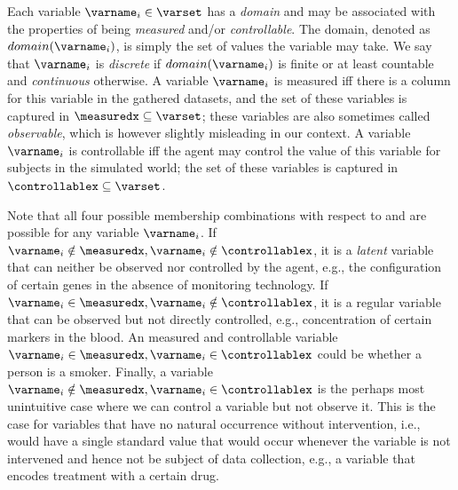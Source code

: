 \documentclass{article}
\begin{document}
        Each variable $\varname_i \in \varset$ has a \emph{domain} and may be associated with the properties of being \emph{measured} and/or \emph{controllable}.
        The domain, denoted as $domain(\varname_i)$, is simply the set of values the variable may take.
        We say that $\varname_i$ is \emph{discrete} if $domain(\varname_i)$ is finite or at least countable and \emph{continuous} otherwise.
        A variable $\varname_i$ is measured iff there is a column for this variable in the gathered datasets, and the set of these variables is captured in $\measuredx \subseteq \varset$; these variables are also sometimes called \emph{observable}, which is however slightly misleading in our context.
        A variable $\varname_i$ is controllable iff the agent may control the value of this variable for subjects in the simulated world; the set of these variables is captured in $\controllablex \subseteq \varset$.
        
        Note that all four possible membership combinations with respect to \measuredx and \controllablex are possible for any variable $\varname_i$.
        If $\varname_i \notin \measuredx, \varname_i \notin \controllablex$, it is a \emph{latent} variable that can neither be observed nor controlled by the agent, e.g., the configuration of certain genes in the absence of monitoring technology.
        If $\varname_i \in \measuredx, \varname_i \notin \controllablex$, it is a regular variable that can be observed but not directly controlled, e.g., concentration of certain markers in the blood.
        An measured and controllable variable $\varname_i \in \measuredx, \varname_i \in \controllablex$ could be whether a person is a smoker.
        Finally, a variable $\varname_i \notin \measuredx, \varname_i \in \controllablex$ is the perhaps most unintuitive case where we can control a variable but not observe it.
        This is the case for variables that have no natural occurrence without intervention, i.e., would have a single standard value that would occur whenever the variable is not intervened and hence not be subject of data collection, e.g., a variable that encodes treatment with a certain drug.
\end{document}
